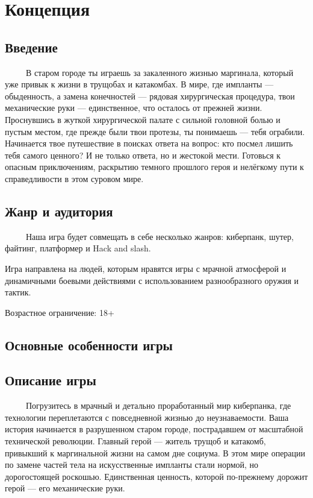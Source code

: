 \documentclass{article}
\begin{document}
\section{Концепция}

\subsection{Введение}
\ \ \ \ \ В старом городе ты играешь за закаленного жизнью маргинала, который уже привык к жизни в трущобах и катакомбах. В мире, где импланты — обыденность, а замена конечностей — рядовая хирургическая процедура, твои механические руки — единственное, что осталось от прежней жизни. Проснувшись в жуткой хирургической палате с сильной головной болью и пустым местом, где прежде были твои протезы, ты понимаешь — тебя ограбили. Начинается твое путешествие в поисках ответа на вопрос: кто посмел лишить тебя самого ценного? И не только ответа, но и жестокой мести. Готовься к опасным приключениям, раскрытию темного прошлого героя и нелёгкому пути к справедливости в этом суровом мире.
\subsection{Жанр и аудитория}
\ \ \ \ \ Наша игра будет совмещать в себе несколько жанров: киберпанк, шутер, файтинг, платформер и Hack and slash.

Игра направлена на людей, которым нравятся игры с  мрачной атмосферой и динамичными боевыми действиями с использованием разнообразного оружия и тактик. 

Возрастное ограничение: 18+
\subsection{Основные особенности игры}

\subsection{Описание игры}
\ \ \ \ \ Погрузитесь в мрачный и детально проработанный мир киберпанка, где технологии переплетаются с повседневной жизнью до неузнаваемости. Ваша история начинается в разрушенном старом городе, пострадавшем от масштабной технической революции. Главный герой — житель трущоб и катакомб, привыкший к маргинальной жизни на самом дне социума. В этом мире операции по замене частей тела на искусственные импланты стали нормой, но дорогостоящей роскошью. Единственная ценность, которой по-прежнему дорожит герой — его механические руки.
\end{document}
